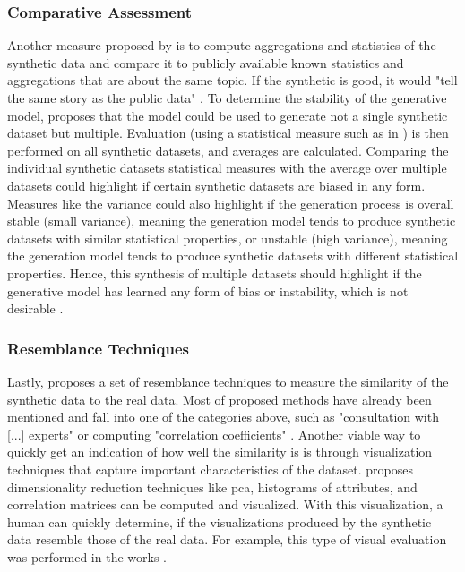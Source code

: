 \subsubsection{Comparative Assessment}
Another measure proposed by \cite{elemam2020SevenWaysEvaluate} is to compute aggregations and statistics of the synthetic data and compare it to publicly available known statistics and aggregations that are about the same topic.
If the synthetic is good, it would "tell the same story as the public data" \cite[p. 58]{elemam2020SevenWaysEvaluate}.
To determine the stability of the generative \gls{model}, \textcite{elemam2020SevenWaysEvaluate} proposes that the \gls{model} could be used to generate not a single synthetic dataset but multiple.
Evaluation (\eg using a statistical measure such as in ) is then performed on all synthetic datasets, and averages are calculated.
Comparing the individual synthetic datasets statistical measures with the average over multiple datasets could highlight if certain synthetic datasets are biased in any form.
Measures like the variance could also highlight if the generation process is overall stable (small variance), meaning the generation \gls{model} tends to produce synthetic datasets with similar statistical properties, 
or unstable (high variance), meaning the generation \gls{model} tends to produce synthetic datasets with different statistical properties. 
Hence, this synthesis of multiple datasets should highlight if the generative \gls{model} has learned any form of bias or instability, which is not desirable \cite{elemam2020SevenWaysEvaluate}.

\subsubsection{Resemblance Techniques}
Lastly, \cite{hernandez2022SyntheticDataGeneration} proposes a set of resemblance techniques to measure the similarity of the synthetic data to the real data.
Most of \cite{hernandez2022SyntheticDataGeneration} proposed methods have already been mentioned and fall into one of the categories above, such as "consultation with [...] experts" or computing "correlation coefficients" \cite{hernandez2022SyntheticDataGeneration}.
Another viable way to quickly get an indication of how well the similarity is is through visualization techniques that capture important characteristics of the dataset.
\textcite{hernandez2022SyntheticDataGeneration} proposes dimensionality reduction techniques like \gls{pca}, histograms of attributes, and correlation matrices can be computed and visualized.
With this visualization, a human can quickly determine, if the visualizations produced by the synthetic data resemble those of the real data.
For example, this type of visual evaluation was performed in the works \textcite{li2022TTSGANTransformerbasedTimeSeries, leminh2021AirGenGANbasedSynthetica, mckeever2020SynthesisingTabularDatasets}.


